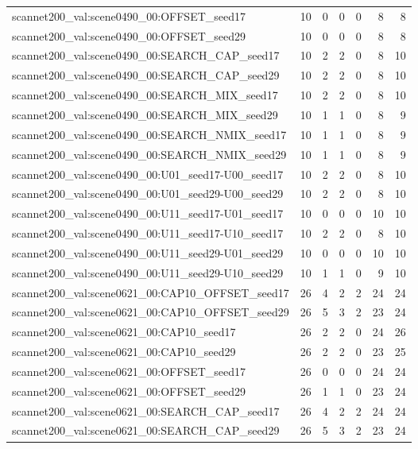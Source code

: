 \begin{table}[t]
\begin{tabular}{lrrrrrr}
scannet200\_val:scene0490\_00:OFFSET\_seed17 & 10 & 0 & 0 & 0 & 8 & 8 \\
scannet200\_val:scene0490\_00:OFFSET\_seed29 & 10 & 0 & 0 & 0 & 8 & 8 \\
scannet200\_val:scene0490\_00:SEARCH\_CAP\_seed17 & 10 & 2 & 2 & 0 & 8 & 10 \\
scannet200\_val:scene0490\_00:SEARCH\_CAP\_seed29 & 10 & 2 & 2 & 0 & 8 & 10 \\
scannet200\_val:scene0490\_00:SEARCH\_MIX\_seed17 & 10 & 2 & 2 & 0 & 8 & 10 \\
scannet200\_val:scene0490\_00:SEARCH\_MIX\_seed29 & 10 & 1 & 1 & 0 & 8 & 9 \\
scannet200\_val:scene0490\_00:SEARCH\_NMIX\_seed17 & 10 & 1 & 1 & 0 & 8 & 9 \\
scannet200\_val:scene0490\_00:SEARCH\_NMIX\_seed29 & 10 & 1 & 1 & 0 & 8 & 9 \\
scannet200\_val:scene0490\_00:U01\_seed17-U00\_seed17 & 10 & 2 & 2 & 0 & 8 & 10 \\
scannet200\_val:scene0490\_00:U01\_seed29-U00\_seed29 & 10 & 2 & 2 & 0 & 8 & 10 \\
scannet200\_val:scene0490\_00:U11\_seed17-U01\_seed17 & 10 & 0 & 0 & 0 & 10 & 10 \\
scannet200\_val:scene0490\_00:U11\_seed17-U10\_seed17 & 10 & 2 & 2 & 0 & 8 & 10 \\
scannet200\_val:scene0490\_00:U11\_seed29-U01\_seed29 & 10 & 0 & 0 & 0 & 10 & 10 \\
scannet200\_val:scene0490\_00:U11\_seed29-U10\_seed29 & 10 & 1 & 1 & 0 & 9 & 10 \\
scannet200\_val:scene0621\_00:CAP10\_OFFSET\_seed17 & 26 & 4 & 2 & 2 & 24 & 24 \\
scannet200\_val:scene0621\_00:CAP10\_OFFSET\_seed29 & 26 & 5 & 3 & 2 & 23 & 24 \\
scannet200\_val:scene0621\_00:CAP10\_seed17 & 26 & 2 & 2 & 0 & 24 & 26 \\
scannet200\_val:scene0621\_00:CAP10\_seed29 & 26 & 2 & 2 & 0 & 23 & 25 \\
scannet200\_val:scene0621\_00:OFFSET\_seed17 & 26 & 0 & 0 & 0 & 24 & 24 \\
scannet200\_val:scene0621\_00:OFFSET\_seed29 & 26 & 1 & 1 & 0 & 23 & 24 \\
scannet200\_val:scene0621\_00:SEARCH\_CAP\_seed17 & 26 & 4 & 2 & 2 & 24 & 24 \\
scannet200\_val:scene0621\_00:SEARCH\_CAP\_seed29 & 26 & 5 & 3 & 2 & 23 & 24 \\

\end{tabular}
\end{table}
